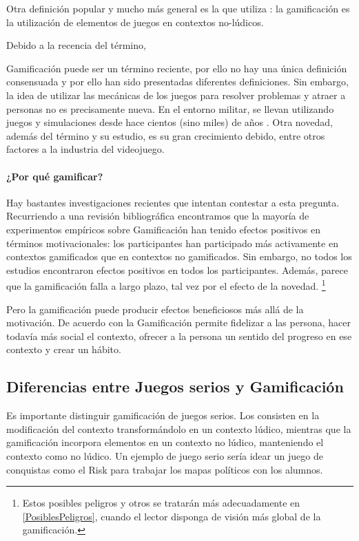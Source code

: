 Otra definición popular y mucho más general es la que utiliza \cite{kwerb-WhatIs}: la gamificación es la utilización de elementos de juegos en contextos no-lúdicos.

Debido a la recencia del término,


Gamificación puede ser un término reciente, por ello no hay una única definición consensuada y por ello han sido presentadas diferentes definiciones.
%
Sin embargo, la idea de utilizar las mecánicas de los juegos para resolver problemas y atraer a personas no es precisamente nueva. 
%
En el entorno militar, se llevan utilizando juegos y simulaciones desde hace cientos (sino miles) de años \cite{GamificationDefII}.
%
Otra novedad, además del término y su estudio, es su gran crecimiento debido, entre otros factores a la industria del videojuego.
%



\paragraph{¿Por qué gamificar?} Hay bastantes investigaciones recientes que intentan contestar a esta pregunta.
%
Recurriendo a una revisión bibliográfica \cite{EmpiricalGamification} encontramos que la mayoría de experimentos empíricos sobre Gamificación han tenido efectos positivos en términos motivacionales: los participantes han participado más activamente en contextos gamificados que en contextos no gamificados.
%
Sin embargo, no todos los estudios encontraron efectos positivos en todos los participantes.
%
Además, parece que la gamificación falla a largo plazo, tal vez por el efecto de la novedad. 
%
\footnote{Estos posibles peligros y otros se tratarán más adecuadamente en \ref{PosiblesPeligros}, cuando el lector disponga de visión más global de la gamificación.}

Pero la gamificación puede producir efectos beneficiosos más allá de la motivación.
% 
De acuerdo con \cite{kwerb-WhyGamify} la Gamificación permite fidelizar a las persona, hacer todavía más social el contexto, ofrecer a la persona un sentido del progreso en ese contexto y crear un hábito.


\subsection{Diferencias entre Juegos serios y Gamificación}

Es importante distinguir gamificación de juegos serios. Los  consisten en la modificación del contexto transformándolo en un contexto lúdico, mientras que la gamificación incorpora elementos en un contexto no lúdico, manteniendo el contexto como no lúdico.
%
Un ejemplo de juego serio sería idear un juego de conquistas como el Risk para trabajar los mapas políticos con los alumnos. 

